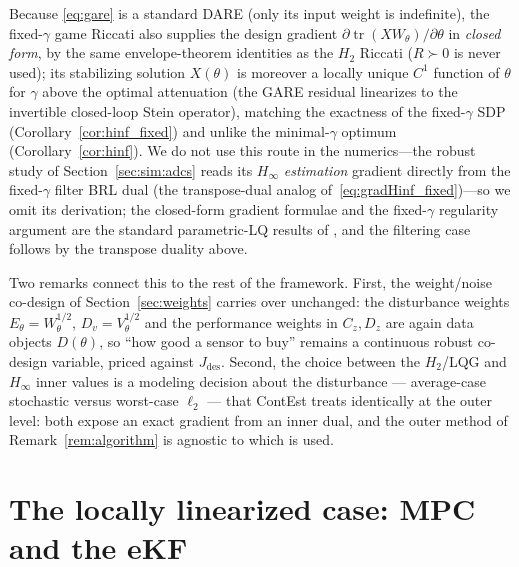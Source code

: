\documentclass[twocolumn,amsthm]{autart}
\begin{document}
\begin{rem}\label{rem:gare}
Because \eqref{eq:gare} is a standard DARE (only its input weight is indefinite),
the fixed-$\gamma$ game Riccati also supplies the design gradient
$\partial\operatorname{tr}(XW_\theta)/\partial\theta$ in \emph{closed form}, by the
same envelope-theorem identities as the $H_2$ Riccati ($R\succ0$ is never used); its
stabilizing solution $X(\theta)$ is moreover a locally unique $C^1$ function of
$\theta$ for $\gamma$ above the optimal attenuation (the GARE residual linearizes to
the invertible closed-loop Stein operator), matching the exactness of the fixed-$\gamma$
SDP (Corollary~\ref{cor:hinf_fixed}) and unlike the minimal-$\gamma$ optimum
(Corollary~\ref{cor:hinf}). We do not use this route in the numerics---the robust
study of Section~\ref{sec:sim:adcs} reads its $H_\infty$ \emph{estimation} gradient
directly from the fixed-$\gamma$ filter BRL dual (the transpose-dual analog
of~\eqref{eq:gradHinf_fixed})---so we omit its derivation; the
closed-form gradient
formulae and the fixed-$\gamma$ regularity argument are the standard parametric-LQ
results of \cite{makila1987computational,rautert1997computational}, and the filtering
case follows by the transpose duality above.
\end{rem}


Two remarks connect this to the rest of the framework. First, the weight/noise
co-design of Section~\ref{sec:weights} carries over unchanged: the disturbance
weights $E_\theta = W_\theta^{1/2}$, $D_v = V_\theta^{1/2}$ and the performance
weights in $C_z, D_z$ are again data objects $D(\theta)$, so ``how good a sensor
to buy'' remains a continuous robust co-design variable, priced against
$J_{\mathrm{des}}$. Second, the choice between the $H_2$/LQG and $H_\infty$ inner
values is a modeling decision about the disturbance --- average-case stochastic
versus worst-case $\ell_2$ --- that ContEst treats identically at the outer level:
both expose an exact gradient from an inner dual, and the outer method of
Remark~\ref{rem:algorithm} is agnostic to which is used.

\section{The locally linearized case: MPC and the eKF}\label{sec:ekf}
\end{document}
